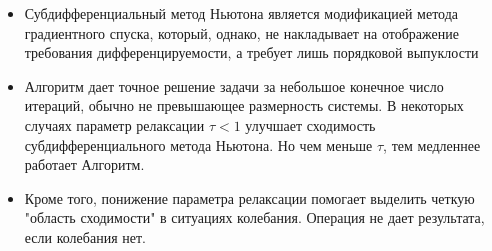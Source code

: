 \documentclass[../body.tex]{subfiles}
\begin{document}
\begin{itemize}
    \item Субдифференциальный метод Ньютона является модификацией метода градиентного спуска, который, однако, не накладывает на отображение требования дифференцируемости, а требует лишь порядковой выпуклости
    \item Алгоритм дает точное решение задачи за небольшое конечное число итераций, обычно не превышающее размерность системы. В некоторых случаях параметр релаксации $\tau < 1$  улучшает сходимость субдифференциального метода Ньютона. Но чем меньше  $\tau$, тем медленнее работает Алгоритм.
    \item Кроме того, понижение параметра релаксации помогает выделить четкую "область сходимости" в ситуациях колебания. Операция не дает результата, если колебания нет.
\end{itemize}
\end{document}
